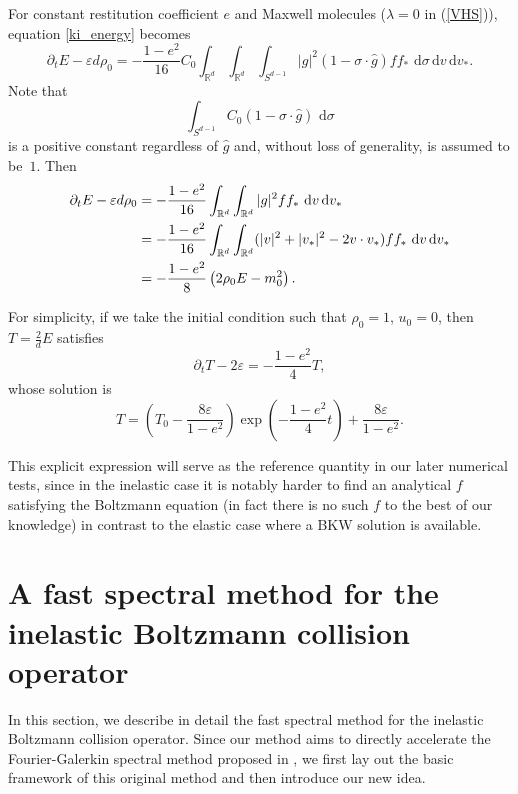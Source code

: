 \documentclass[review,times]{elsarticle}
\newcommand{\rd}{\,\mathrm{d}}
\begin{document}
For constant restitution coefficient $e$ and Maxwell molecules ($\lambda=0$ in (\ref{VHS})), equation \eqref{ki_energy} becomes
\begin{equation} 
\partial_t E -\varepsilon d\rho_0=-\frac{1-e^2}{16}C_0\int_{\mathbb{R}^d}\int_{\mathbb{R}^d}\int_{S^{d-1}}  |g|^{2}(1-\sigma\cdot \hat{g})ff_*\,\rd{\sigma}\rd{v}\rd{v_*}.
\end{equation}
Note that
\begin{equation}
\int_{S^{d-1}} C_0(1-\sigma\cdot \hat{g})\,\rd{\sigma}
\end{equation}
is a positive constant regardless of $\hat{g}$ and, without loss of generality, is assumed to be~$1$. Then
\begin{align} 
  \partial_t E -\varepsilon d\rho_0 &=-\frac{1-e^2}{16}\int_{\mathbb{R}^d}\int_{\mathbb{R}^d} |g|^{2}ff_*\,\rd{v}\rd{v_*} \notag\\
   & =-\frac{1-e^2}{16}\int_{\mathbb{R}^d}\int_{\mathbb{R}^d} (|v|^2+|v_*|^2-2v\cdot v_*)ff_*\,\rd{v}\rd{v_*} \notag \\
   &=-\frac{1-e^2}{8}\left(2\rho_0E - m_0^2\right).
\end{align}

For simplicity, if we take the initial condition such that $\rho_0=1$, $u_0=0$, then $T=\frac{2}{d}E$ satisfies
\begin{equation}
\partial_t T-2\varepsilon =-\frac{1-e^2}{4}T,
\end{equation}
whose solution is
\begin{equation}\label{soln:T}
T=\left(T_0-\frac{8\varepsilon}{1-e^2}\right)\exp{\left(-\frac{1-e^2}{4}t\right)}+\frac{8\varepsilon}{1-e^2}.
\end{equation}

\begin{rmk}
This explicit expression will serve as the reference quantity in our later numerical tests, since in the inelastic case it is notably harder to find an analytical $f$ satisfying the Boltzmann equation (in fact there is no such $f$ to the best of our knowledge) in contrast to the elastic case where a BKW solution is available.
\end{rmk}


\section{A fast spectral method for the inelastic Boltzmann collision operator}

In this section, we describe in detail the fast spectral method for the inelastic Boltzmann collision operator. Since our method aims to directly accelerate the Fourier-Galerkin spectral method proposed in \cite{FPT05}, we first lay out the basic framework of this original method and then introduce our new idea.
\end{document}
